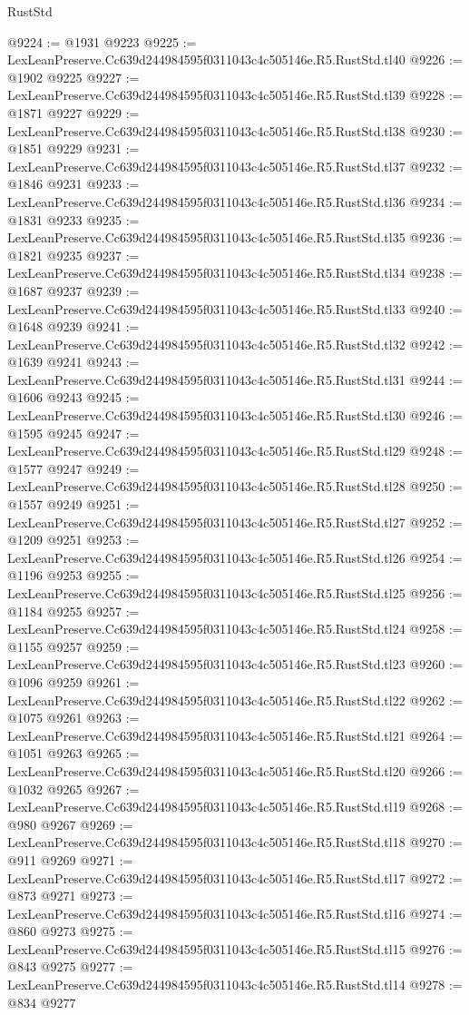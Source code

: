 \begin{lexlean}{RustStd}
\begin{coremodule}
@9224 := @1931 @9223
@9225 := LexLeanPreserve.Cc639d244984595f0311043c4c505146e.R5.RustStd.tl40
@9226 := @1902 @9225
@9227 := LexLeanPreserve.Cc639d244984595f0311043c4c505146e.R5.RustStd.tl39
@9228 := @1871 @9227
@9229 := LexLeanPreserve.Cc639d244984595f0311043c4c505146e.R5.RustStd.tl38
@9230 := @1851 @9229
@9231 := LexLeanPreserve.Cc639d244984595f0311043c4c505146e.R5.RustStd.tl37
@9232 := @1846 @9231
@9233 := LexLeanPreserve.Cc639d244984595f0311043c4c505146e.R5.RustStd.tl36
@9234 := @1831 @9233
@9235 := LexLeanPreserve.Cc639d244984595f0311043c4c505146e.R5.RustStd.tl35
@9236 := @1821 @9235
@9237 := LexLeanPreserve.Cc639d244984595f0311043c4c505146e.R5.RustStd.tl34
@9238 := @1687 @9237
@9239 := LexLeanPreserve.Cc639d244984595f0311043c4c505146e.R5.RustStd.tl33
@9240 := @1648 @9239
@9241 := LexLeanPreserve.Cc639d244984595f0311043c4c505146e.R5.RustStd.tl32
@9242 := @1639 @9241
@9243 := LexLeanPreserve.Cc639d244984595f0311043c4c505146e.R5.RustStd.tl31
@9244 := @1606 @9243
@9245 := LexLeanPreserve.Cc639d244984595f0311043c4c505146e.R5.RustStd.tl30
@9246 := @1595 @9245
@9247 := LexLeanPreserve.Cc639d244984595f0311043c4c505146e.R5.RustStd.tl29
@9248 := @1577 @9247
@9249 := LexLeanPreserve.Cc639d244984595f0311043c4c505146e.R5.RustStd.tl28
@9250 := @1557 @9249
@9251 := LexLeanPreserve.Cc639d244984595f0311043c4c505146e.R5.RustStd.tl27
@9252 := @1209 @9251
@9253 := LexLeanPreserve.Cc639d244984595f0311043c4c505146e.R5.RustStd.tl26
@9254 := @1196 @9253
@9255 := LexLeanPreserve.Cc639d244984595f0311043c4c505146e.R5.RustStd.tl25
@9256 := @1184 @9255
@9257 := LexLeanPreserve.Cc639d244984595f0311043c4c505146e.R5.RustStd.tl24
@9258 := @1155 @9257
@9259 := LexLeanPreserve.Cc639d244984595f0311043c4c505146e.R5.RustStd.tl23
@9260 := @1096 @9259
@9261 := LexLeanPreserve.Cc639d244984595f0311043c4c505146e.R5.RustStd.tl22
@9262 := @1075 @9261
@9263 := LexLeanPreserve.Cc639d244984595f0311043c4c505146e.R5.RustStd.tl21
@9264 := @1051 @9263
@9265 := LexLeanPreserve.Cc639d244984595f0311043c4c505146e.R5.RustStd.tl20
@9266 := @1032 @9265
@9267 := LexLeanPreserve.Cc639d244984595f0311043c4c505146e.R5.RustStd.tl19
@9268 := @980 @9267
@9269 := LexLeanPreserve.Cc639d244984595f0311043c4c505146e.R5.RustStd.tl18
@9270 := @911 @9269
@9271 := LexLeanPreserve.Cc639d244984595f0311043c4c505146e.R5.RustStd.tl17
@9272 := @873 @9271
@9273 := LexLeanPreserve.Cc639d244984595f0311043c4c505146e.R5.RustStd.tl16
@9274 := @860 @9273
@9275 := LexLeanPreserve.Cc639d244984595f0311043c4c505146e.R5.RustStd.tl15
@9276 := @843 @9275
@9277 := LexLeanPreserve.Cc639d244984595f0311043c4c505146e.R5.RustStd.tl14
@9278 := @834 @9277

\end{coremodule}
\end{lexlean}
